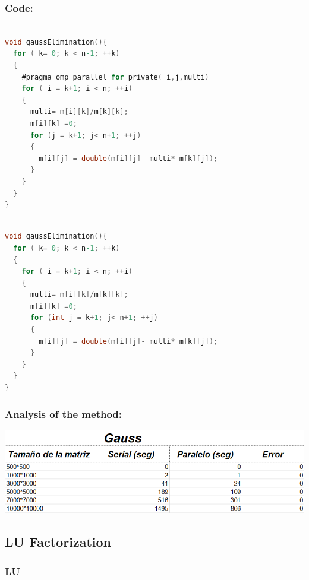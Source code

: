 \documentclass{article}
\newcounter{subsubsubsection}[subsubsection]
\begin{document}
\subsubsection{Code:}


\begin{lstlisting}[language=C]

void gaussElimination(){
  for ( k= 0; k < n-1; ++k)
  {
    #pragma omp parallel for private( i,j,multi)
    for ( i = k+1; i < n; ++i)
    {
      multi= m[i][k]/m[k][k];
      m[i][k] =0;
      for (j = k+1; j< n+1; ++j)
      {
        m[i][j] = double(m[i][j]- multi* m[k][j]);
      }
    }
  }
}

\end{lstlisting}


\begin{lstlisting}[language=C]

void gaussElimination(){
  for ( k= 0; k < n-1; ++k)
  {
    for ( i = k+1; i < n; ++i)
    {
      multi= m[i][k]/m[k][k];
      m[i][k] =0;
      for (int j = k+1; j< n+1; ++j)
      {
        m[i][j] = double(m[i][j]- multi* m[k][j]);
      }
    }
  }
}
\end{lstlisting}

\subsubsection{Analysis of the method:}
\includegraphics[width=\linewidth]{./images/gauss.PNG}\\

\subsection{LU Factorization}

\subsubsection{LU}

\end{document}
